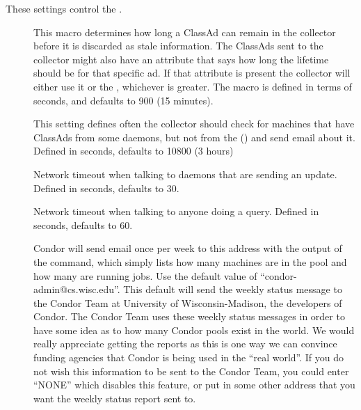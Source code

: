 These settings control the .

\begin{description}
  
\item[] \label{param:ClassadLifetime} This
  macro determines how long a ClassAd can remain in the collector
  before it is discarded as stale information.  The ClassAds sent to
  the collector might also have an attribute that says how long the
  lifetime should be for that specific ad.  If that attribute is
  present the collector will either use it or the
  , whichever is greater.  The macro is
  defined in terms of seconds, and defaults to 900 (15 minutes).
  
\item[]
  \label{param:MasterCheckInterval}  This setting defines often the
  collector should check for machines that have ClassAds from some
  daemons, but not from the  ()
  and send email about it.  Defined in seconds, defaults to 10800 (3
  hours)
  
\item[] \label{param:ClientTimeout} Network
  timeout when talking to daemons that are sending an update.  Defined
  in seconds, defaults to 30.
  
\item[] \label{param:QueryTimeout} Network
  timeout when talking to anyone doing a query. Defined in seconds,
  defaults to 60.
  
\item[] \label{param:CondorDevelopers}
  Condor will send email once per week to this address with the output
  of the  command, which simply lists how many machines
  are in the pool and how many are running jobs.  Use the default
  value of ``condor-admin@cs.wisc.edu''. This default will send the
  weekly status message to the Condor Team at University of
  Wisconsin-Madison, the developers of Condor.  The Condor Team uses
  these weekly status messages in order to have some idea as to how
  many Condor pools exist in the world.  We would really appreciate
  getting the reports as this is one way we can convince funding
  agencies that Condor is being used in the ``real world''.  If you do
  not wish this information to be sent to the Condor Team, you could
  enter ``NONE'' which disables this feature, or put in some other
  address that you want the weekly status report sent to.

\end{description}

